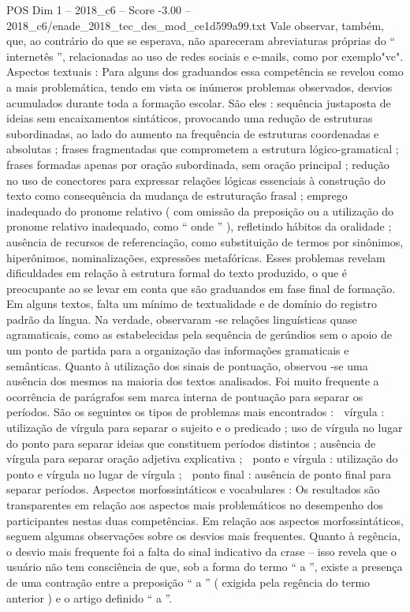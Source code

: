 \begin{textsample}{POS Dim 1 – 2018\_c6 – Score -3.00 – 2018\_c6/enade\_2018\_tec\_des\_mod\_ce1d599a99.txt}
Vale observar, também, que, ao contrário do que se esperava, não apareceram abreviaturas próprias do “ internetês ”, relacionadas ao uso de redes sociais e e-mails, como por exemplo"vc".
Aspectos textuais : Para alguns dos graduandos essa competência se revelou como a mais problemática, tendo em vista os inúmeros problemas observados, desvios acumulados durante toda a formação escolar.
São eles : sequência justaposta de ideias sem encaixamentos sintáticos, provocando uma redução de estruturas subordinadas, ao lado do aumento na frequência de estruturas coordenadas e absolutas ; frases fragmentadas que comprometem a estrutura lógico-gramatical ; frases formadas apenas por oração subordinada, sem oração principal ; redução no uso de conectores para expressar relações lógicas essenciais à construção do texto como consequência da mudança de estruturação frasal ; emprego inadequado do pronome relativo ( com omissão da preposição ou a utilização do pronome relativo inadequado, como “ onde ” ), refletindo hábitos da oralidade ; ausência de recursos de referenciação, como substituição de termos por sinônimos, hiperônimos, nominalizações, expressões metafóricas.
Esses problemas revelam dificuldades em relação à estrutura formal do texto produzido, o que é preocupante ao se levar em conta que são graduandos em fase final de formação.
Em alguns textos, falta um mínimo de textualidade e de domínio do registro padrão da língua.
Na verdade, observaram -se relações linguísticas quase agramaticais, como as estabelecidas pela sequência de gerúndios sem o apoio de um ponto de partida para a organização das informações gramaticais e semânticas.
Quanto à utilização dos sinais de pontuação, observou -se uma ausência dos mesmos na maioria dos textos analisados.
Foi muito frequente a ocorrência de parágrafos sem marca interna de pontuação para separar os períodos.
São os seguintes os tipos de problemas mais encontrados :  vírgula : utilização de vírgula para separar o sujeito e o predicado ; uso de vírgula no lugar do ponto para separar ideias que constituem períodos distintos ; ausência de vírgula para separar oração adjetiva explicativa ;  ponto e vírgula : utilização do ponto e vírgula no lugar de vírgula ;  ponto final : ausência de ponto final para separar períodos.
Aspectos morfossintáticos e vocabulares : Os resultados são transparentes em relação aos aspectos mais problemáticos no desempenho dos participantes nestas duas competências.
Em relação aos aspectos morfossintáticos, seguem algumas observações sobre os desvios mais frequentes.
Quanto à regência, o desvio mais frequente foi a falta do sinal indicativo da crase – isso revela que o usuário não tem consciência de que, sob a forma do termo “ a ”, existe a presença de uma contração entre a preposição “ a ” ( exigida pela regência do termo anterior ) e o artigo definido “ a ”.

\end{textsample}
